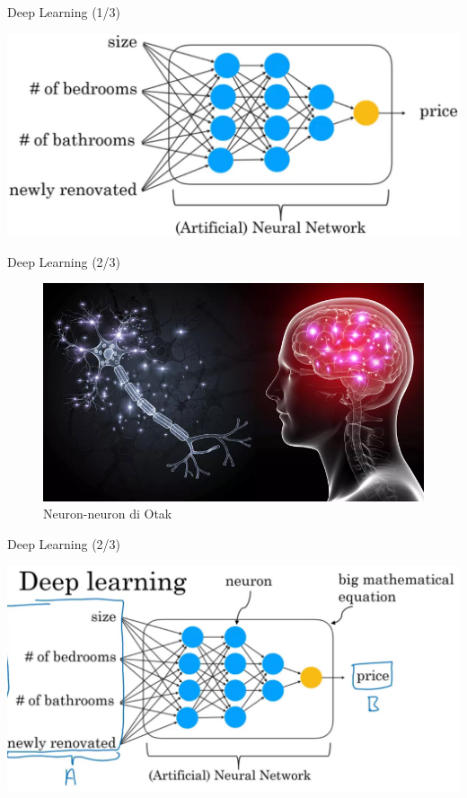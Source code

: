 \documentclass[pdf]{beamer}
\theoremstyle{mystyle}
\begin{document}
\begin{frame}{Deep Learning (1/3)}
	\begin{center}
		\includegraphics[scale=.275]{deep-learning}
	\end{center}	
\end{frame}

\begin{frame}{Deep Learning (2/3)}
		\begin{figure}[!ht]
	\centering
	\includegraphics[scale=.4]{images/brain-neurons}		
	\caption{Neuron-neuron di Otak \citep{ankrom2020howbrain}}
\end{figure}
\end{frame}

\begin{frame}{Deep Learning (2/3)}
	\begin{center}
		\includegraphics[scale=.24]{deep-learning-2}
	\end{center}	
\end{frame}
\end{document}
